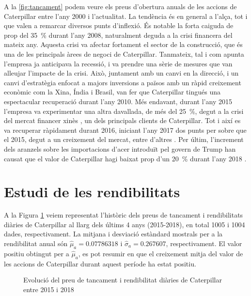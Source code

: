 \documentclass{article}
\numberwithin{table}{section}
\numberwithin{figure}{section}
\numberwithin{equation}{section}
\begin{document}
A la \cref{fig:tancament} podem veure els preus d'obertura anuals de les accions de Caterpillar entre l'any 2000 i l'actualitat. La tendència és en general a l'alça, tot i que valen a remarcar diversos punts d'inflexió. És notable la forta caiguda de prop del \SI{35}{\percent} durant l'any 2008, naturalment deguda a la crisi financera del mateix any. Aquesta crisi va afectar fortament el sector de la construcció, que és una de les principals àrees de negoci de Caterpillar. Tanmateix, tal i com apunta \cite{recupera} l'empresa ja anticipava la recessió, i va prendre una sèrie de mesures que van alleujar l'impacte de la crisi. Això, juntament amb un canvi en la direcció, i un canvi d'estratègia enfocat a majors inversions a països amb un ràpid creixement econòmic com la Xina, Índia i Brasil, van fer que Caterpillar tingués una espectacular recuperació durant l'any 2010. Més endavant, durant l'any 2015 l'empresa va experimentar una altra davallada, de més del \SI{25}{\percent}, degut a la crisi del mercat financer xinès \cite{xina}, un dels principals clients de Caterpillar. Tot i així es va recuperar ràpidament durant 2016, iniciant l'any 2017 dos punts per sobre que el 2015, degut a un creixement del mercat, entre d'altres \cite{crush}. Per últim, l'increment dels aranzels sobre les importacions d'acer introduït pel govern de Trump han causat que el valor de Caterpillar hagi baixat prop d'un \SI{20}{\percent} durant l'any 2018 \cite{trump}.


\section{Estudi de les rendibilitats}







A la Figura \ref{fig:serie preus} veiem representat l'històric dels preus de tancament i rendibilitats diàries de Caterpillar al llarg dels últims 4 anys (2015-2018), en total 1005 i 1004 dades, respectivament. La mitjana i desviació estàndard mostrals per a la rendibilitat anual són $\hat{\mu}_a=0.07786318$ i $\hat{\sigma}_a=0.267607$, respectivament. El valor positiu obtingut per a $\hat{\mu}_a$, es pot resumir en que el creixement mitja del valor de les accions de Caterpillar durant aquest període ha estat positiu.\\
\begin{figure}[H]
\centering \sffamily \small

\caption{Evolució del preu de tancament i rendibilitat diàries de Caterpillar entre 2015 i 2018}
\label{fig:serie preus}
\end{figure}
\end{document}
